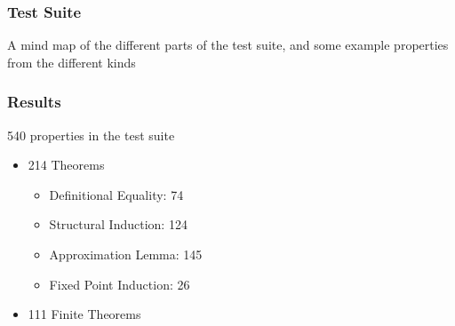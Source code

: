 \documentclass[serif,professionalfont]{beamer}
\begin{document}

\begin{frame}
\frametitle{Test Suite}

A mind map of the different parts of the test suite, and some example
properties from the different kinds
\end{frame}



\begin{frame}
\frametitle{Results}
\label{sec-5}

540 properties in the test suite

\begin{itemize}
\item 214 Theorems
      \begin{itemize}
      \item Definitional Equality: 74
      \item Structural Induction:  124
      \item Approximation Lemma:   145
      \item Fixed Point Induction: 26
      \end{itemize}
\item 111 Finite Theorems
\end{itemize}

\end{frame}
\end{document}
